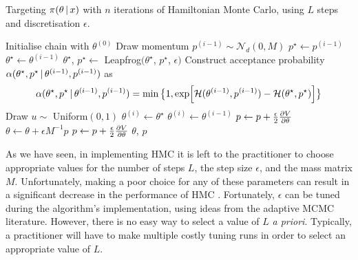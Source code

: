 \begin{algorithm}[tb]
  \caption{Targeting $\pi(\theta \,|\, x)$ with $n$ iterations of Hamiltonian Monte
  Carlo, using $L$ steps and discretisation $\epsilon$.}
  \label{alg:hmc}
  \begin{algorithmic}[1]
    \State Initialise chain with $\theta^{(0)}$
      \State Draw momentum $p^{(i-1)} \sim \mathcal{N}_d(0, M)$
      \State $p^\star \leftarrow p^{(i-1)}$
      \State $\theta^\star \leftarrow\theta^{(i-1)}$
      \State {}
        \State $\theta^\star$, $p^\star \leftarrow$ Leapfrog$(\theta^\star$,
                                                             $p^\star$, $\epsilon)$
      \EndFor
      \State Construct acceptance probability $\alpha(\theta^\star, p^\star \,|\,
                                               \theta^{(i-1)}, p^{(i-1)})$ as
        \begin{equation*}
            \alpha(\theta^\star, p^\star \,|\,\theta^{(i-1)}, p^{(i-1)}) =
            \min\big\{1, \exp[\mathcal{H}(\theta^{(i-1)}, p^{(i-1)}) -
                              \mathcal{H}(\theta^\star, p^\star)]
                  \big\}
        \end{equation*}
      \State Draw $u \sim$ Uniform$(0, 1)$
        \State {}
        \State $\theta^{(i)} \leftarrow\theta^\star$
      \Else
        \State {}
        \State $\theta^{(i)} \leftarrow\theta^{(i-1)}$
      \EndIf
    \EndFor
  \State
    \State $p \leftarrow p + \frac{\epsilon}{2} \pdv{V}{\theta}$
    \State $\theta \leftarrow \theta + \epsilon M^{-1} p$
    \State $p \leftarrow p + \frac{\epsilon}{2} \pdv{V}{\theta}$
    \State \Return $\theta$, $p$
  \EndProcedure
  \end{algorithmic}
\end{algorithm}

As we have seen, in implementing HMC it is left to the practitioner to choose
appropriate values for the number of steps $L$, the step size $\epsilon$, and
the mass matrix $M$. Unfortunately, making a poor choice for any of these
parameters can result in a significant decrease in the performance of HMC
\parencite{hoffman14}. Fortunately, $\epsilon$ can be tuned during the
algorithm's implementation, using ideas from the adaptive MCMC literature.
However, there is no easy way to select a value of $L$ \emph{a priori}.
Typically, a practitioner will have to make multiple costly tuning runs in
order to select an appropriate value of $L$.

